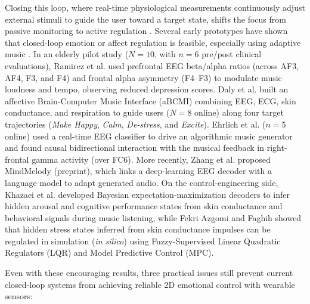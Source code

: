 \documentclass[a4paper,fleqn]{cas-dc}
\begin{document}
Closing this loop, where real-time physiological measurements continuously adjust external stimuli to guide the user toward a target state, shifts the focus from passive monitoring to active regulation \cite{ewing2016evaluation,lorenz2016automatic}. Several early prototypes have shown that closed-loop emotion or affect regulation is feasible, especially using adaptive music \cite{sayal2025music,ramirez2015musical,daly2016affective,ehrlich2019closed}. In an elderly pilot study ($N = 10$, with $n = 6$ pre/post clinical evaluations), Ramirez et al. \cite{ramirez2015musical} used prefrontal EEG beta/alpha ratios (across AF3, AF4, F3, and F4) and frontal alpha asymmetry (F4--F3) to modulate music loudness and tempo, observing reduced depression scores. Daly et al. \cite{daly2016affective} built an affective Brain-Computer Music Interface (aBCMI) combining EEG, ECG, skin conductance, and respiration to guide users ($N = 8$ online) along four target trajectories (\textit{Make Happy}, \textit{Calm}, \textit{De-stress}, and \textit{Excite}). Ehrlich et al. \cite{ehrlich2019closed} ($n = 5$ online) used a real-time EEG classifier to drive an algorithmic music generator and found causal bidirectional interaction with the musical feedback in right-frontal gamma activity (over FC6). More recently, Zhang et al. \cite{zhang2026mindmelody} proposed MindMelody (preprint), which links a deep-learning EEG decoder with a language model to adapt generated audio. On the control-engineering side, Khazaei et al. \cite{khazaei2024bayesian} developed Bayesian expectation-maximization decoders to infer hidden arousal and cognitive performance states from skin conductance and behavioral signals during music listening, while Fekri Azgomi and Faghih \cite{azgomi2022enhancement} showed that hidden stress states inferred from skin conductance impulses can be regulated in simulation (\textit{in silico}) using Fuzzy-Supervised Linear Quadratic Regulators (LQR) and Model Predictive Control (MPC).

Even with these encouraging results, three practical issues still prevent current closed-loop systems from achieving reliable 2D emotional control with wearable sensors:
\end{document}
